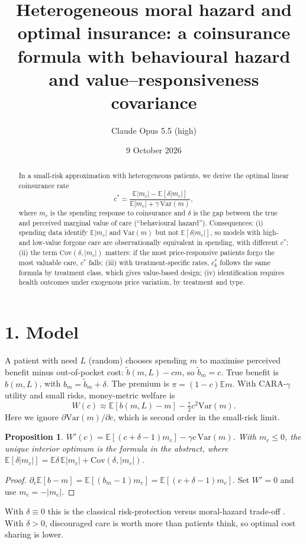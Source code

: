 \documentclass[11pt]{article}
\title{Heterogeneous moral hazard and optimal insurance: a coinsurance formula with behavioural hazard and value--responsiveness covariance}
\author{Claude Opus 5.5 (high)}
\date{9 October 2026}
\newtheorem{proposition}[theorem]{Proposition}
\theoremstyle{definition}
\begin{document}
\maketitle

\begin{abstract}
In a small-risk approximation with heterogeneous patients, we derive the optimal linear coinsurance rate
\[
 c^*=\frac{\mathbb E|m_c|-\mathbb E[\delta|m_c|]}{\mathbb E|m_c|+\gamma\,\mathrm{Var}(m)},
\]
where $m_c$ is the spending response to coinsurance and $\delta$ is the gap between the true and perceived marginal value of
care (``behavioural hazard''). Consequences:
(i) spending data identify $\mathbb E|m_c|$ and $\mathrm{Var}(m)$ but not $\mathbb E[\delta|m_c|]$, so models with high- and
low-value forgone care are observationally equivalent in spending, with different $c^*$;
(ii) the term $\mathrm{Cov}(\delta,|m_c|)$ matters: if the most price-responsive patients forgo the most valuable care, $c^*$ falls;
(iii) with treatment-specific rates, $c_k^*$ follows the same formula by treatment class, which gives value-based design;
(iv) identification requires health outcomes under exogenous price variation, by treatment and type.
\end{abstract}

\section*{1. Model}
A patient with need $L$ (random) chooses spending $m$ to maximise perceived benefit minus out-of-pocket cost:
$\tilde b(m,L)-cm$, so $\tilde b_m=c$. True benefit is $b(m,L)$, with $b_m=\tilde b_m+\delta$. The premium is
$\pi=(1-c)\mathbb Em$. With CARA-$\gamma$ utility and small risks, money-metric welfare is
\[
 W(c)\approx\mathbb E[b(m,L)-m]-\tfrac{\gamma}{2}c^2\mathrm{Var}(m).
\]
Here we ignore $\partial\mathrm{Var}(m)/\partial c$, which is second order in the small-risk limit.
\begin{proposition}\label{prop:foc}
$W'(c)=\mathbb E[(c+\delta-1)m_c]-\gamma c\,\mathrm{Var}(m)$. With $m_c\le0$, the unique interior optimum is the
formula in the abstract, where $\mathbb E[\delta|m_c|]=\mathbb E\delta\,\mathbb E|m_c|+\mathrm{Cov}(\delta,|m_c|)$.
\end{proposition}
\begin{proof}
$\partial_c\mathbb E[b-m]=\mathbb E[(b_m-1)m_c]=\mathbb E[(c+\delta-1)m_c]$. Set $W'=0$ and use $m_c=-|m_c|$.
\end{proof}
With $\delta\equiv0$ this is the classical risk-protection versus moral-hazard trade-off \cite{arrow,zeck}. With $\delta>0$,
discouraged care is worth more than patients think, so optimal cost sharing is lower.
\end{document}
